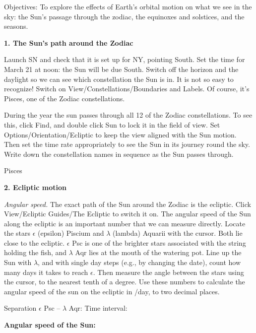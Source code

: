 \bigskip

\noindent
{Objectives:} To explore the effects of Earth's orbital motion on what
we see in the sky: the Sun's passage through the zodiac, the equinoxes
and solstices, and the seasons.

\medskip
\bigskip
\noindent
{\bf 1. The Sun's path around the Zodiac}

\medskip
\noindent
Launch SN and check that it is set up for NY, pointing South.  Set the
time for March 21 at noon: the Sun will be due South. Switch off the
horizon and the daylight so we can see which constellation the Sun is
in. It is not so easy to recognize! Switch on
View/Constellations/Boundaries and Labels. Of course, it's Pisces, one
of the Zodiac constellations.

During the year the sun passes through all 12 of the Zodiac
constellations. To see this, click Find, and double click Sun to lock
it in the field of view. Set Options/Orientation/Ecliptic to keep the
view aligned with the Sun motion. Then set the time rate appropriately
to see the Sun in its journey round the sky. Write down the
constellation names in sequence as the Sun passes through.

\medskip
Pisces \hrulefill


 \hrulefill

\bigskip
\noindent
{\bf 2. Ecliptic motion}

\medskip
\noindent
\emph{Angular speed.} The exact path of the Sun around the Zodiac is
the ecliptic. Click View/Ecliptic Guides/The Ecliptic to switch it
on. The angular speed of the Sun along the ecliptic is an important
number that we can measure directly.  Locate the stars $\epsilon$
(epsilon) Piscium and $\lambda$ (lambda) Aquarii with the cursor.
Both lie close to the ecliptic.  $\epsilon$ Psc is one of the brighter
stars associated with the string holding the fish, and $\lambda$ Aqr
lies at the mouth of the watering pot.  Line up the Sun with
$\lambda$, and with single day steps (e.g., by changing the date),
count how many days it takes to reach $\epsilon$. Then measure the
angle between the stars using the cursor, to the nearest tenth of a
degree.  Use these numbers to calculate the angular speed of the sun
on the ecliptic in \deg/day, to two decimal places.

\medskip Separation $\epsilon$ Psc -- $\lambda$
Aqr: \makebox[3cm]{\hrulefill} Time interval: \makebox[3cm]{\hrulefill} 

\medskip 
\centerline{{\bf Angular speed of the Sun:}
\makebox[4cm]{\hrulefill}  }

